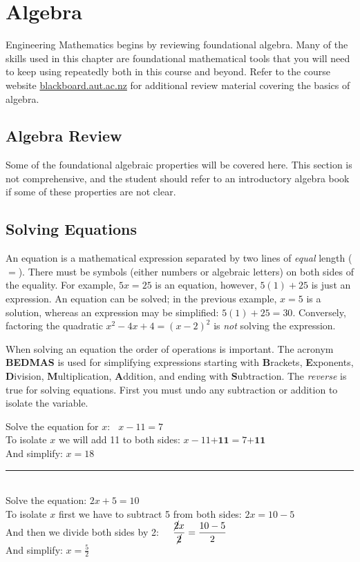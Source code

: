 \chapter{Algebra}
Engineering Mathematics begins by reviewing foundational algebra. Many of the skills used in this chapter are foundational mathematical tools that you will need to keep using repeatedly both in this course and beyond. Refer to the course website \url{blackboard.aut.ac.nz} for additional review material covering the basics of algebra.

\section{Algebra Review}\label{sec:introAlgebra}
Some of the foundational algebraic properties will be covered here. This section is not comprehensive, and the student should refer to an introductory algebra book if some of these properties are not clear.

\section*{Solving Equations}
An equation is a mathematical expression separated by two lines of \textit{equal} length ($=$). There must be symbols (either numbers or algebraic letters) on both sides of the equality. For example, $5x=25$ is an equation, however, $5(1)+25$ is just an expression. An equation can be solved; in the previous example, $x=5$ is a solution, whereas an expression may be simplified: $5(1)+25=30$. Conversely, factoring the quadratic $x^2-4x+4=(x-2)^2$ is \textit{not} solving the expression.

When solving an equation the order of operations is important. The acronym \textbf{BEDMAS} is used for simplifying expressions starting with \textbf{B}rackets, \textbf{E}xponents, \textbf{D}ivision, \textbf{M}ultiplication, \textbf{A}ddition, and ending with \textbf{S}ubtraction. The \textit{reverse} is true for solving equations. First you must undo any subtraction or addition to isolate the variable.

\example Solve the equation for $x$: $\phantom{a}x-11=7$\medskip\\
\solution To isolate $x$ we will add 11 to both sides: $x-11\textbf{+11}=7\textbf{+11}$\\
And simplify: $x=18$\\
\rule{6.8cm}{0.5pt}\\
\example Solve the equation: $2x+5=10$\medskip\\
\solution To isolate $x$ first we have to subtract 5 from both sides: $2x=10-5$\\
And then we divide both sides by 2: $\displaystyle\phantom{aa}\frac{\cancel{2}x}{\cancel{2}}=\frac{10-5}{2}$\\
And simplify: $\displaystyle x=\frac{5}{2}$

